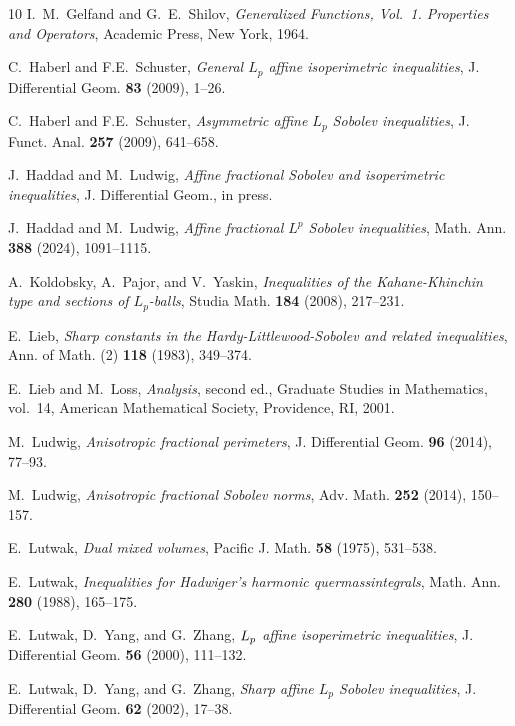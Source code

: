 \documentclass{amsart}
\begin{document}
\begin{thebibliography}{10}
I.~M.~Gelfand and G.~E.~Shilov, {\em Generalized Functions, Vol.~1. Properties and Operators}, Academic Press, New York, 1964.

C.~Haberl and F.E.~Schuster, {\em General ${L}_p$ affine isoperimetric inequalities}, J. Differential Geom. {\bf 83} (2009), 1--26.

C.~Haberl and F.E.~Schuster, {\em Asymmetric affine $L_p$ Sobolev inequalities}, J. Funct. Anal. {\bf 257} (2009), 641--658.

J.~Haddad and M.~Ludwig, {\em Affine fractional Sobolev and isoperimetric inequalities}, J. Differential Geom., in press.

J.~Haddad and M.~Ludwig, {\em Affine fractional $L^p$ Sobolev inequalities}, Math. Ann. {\bf 388} (2024),  1091--1115. 

A.~Koldobsky, A.~Pajor, and V.~Yaskin, {\em Inequalities of the
  {K}ahane-{K}hinchin type and sections of {$L_p$}-balls}, Studia Math. {\bf
  184} (2008), 217--231.

E.~Lieb, {\em Sharp constants in the {H}ardy-{L}ittlewood-{S}obolev and related inequalities}, Ann. of Math. (2) {\bf 118} (1983), 349--374.
  
E.~Lieb and M.~Loss, {\em Analysis}, second ed., Graduate Studies in Mathematics, vol.~14, American Mathematical Society, Providence, RI, 2001.  

M.~Ludwig, {\em Anisotropic fractional perimeters}, J. Differential Geom. {\bf 96} (2014), 77--93.

M.~Ludwig, {\em Anisotropic fractional {S}obolev norms}, Adv. Math. {\bf  252} (2014), 150--157.

E.~Lutwak, {\em Dual mixed volumes}, Pacific J. Math. {\bf 58} (1975), 531--538.

E.~Lutwak, {\em Inequalities for {H}adwiger's harmonic quermassintegrals}, Math. Ann. {\bf 280} (1988), 165--175.

E.~Lutwak, D.~Yang, and G.~Zhang, {\em ${L}\sb p$ affine isoperimetric  inequalities}, J. Differential Geom. {\bf 56} (2000), 111--132.

E.~Lutwak, D.~Yang, and G.~Zhang, {\em Sharp affine ${L}_p$ {S}obolev   inequalities}, J. Differential Geom. {\bf 62} (2002), 17--38.


\end{thebibliography}
\end{document}
